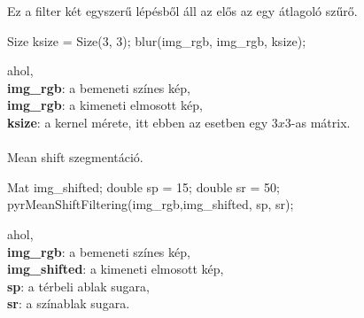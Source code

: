 Ez a filter két egyszerű lépésből áll az elős az egy átlagoló szűrő.
\begin{cpp}
Size ksize = Size(3, 3);
blur(img_rgb, img_rgb, ksize);
\end{cpp}
 ahol, \\
\indent \textbf{img\_rgb}: a bemeneti színes kép,\\
\indent \textbf{img\_rgb}: a kimeneti elmosott kép,\\
\indent \textbf{ksize}: a kernel mérete, itt ebben az esetben egy $3 x 3$-as mátrix. \\ \\
Mean shift szegmentáció.
\begin{cpp}
Mat img_shifted;
double sp = 15;
double sr = 50;
pyrMeanShiftFiltering(img_rgb,img_shifted, sp, sr);
\end{cpp}
 ahol, \\
\indent \textbf{img\_rgb}: a bemeneti színes kép,\\
\indent \textbf{img\_shifted}: a kimeneti elmosott kép,\\
\indent \textbf{sp}: a térbeli ablak sugara,\\
\indent \textbf{sr}: a színablak sugara.



